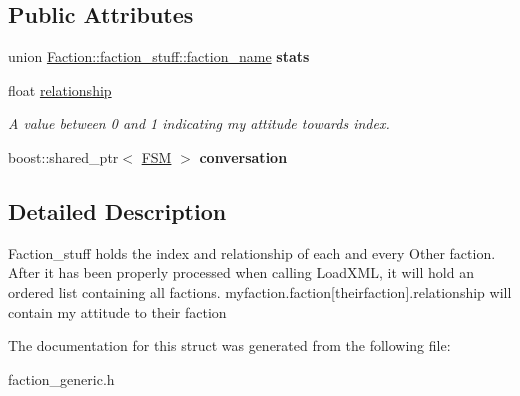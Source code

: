 \subsection*{Public Attributes}
\begin{DoxyCompactItemize}
\item 
union \hyperlink{unionFaction_1_1faction__stuff_1_1faction__name}{Faction\+::faction\+\_\+stuff\+::faction\+\_\+name} {\bfseries stats}\hypertarget{structFaction_1_1faction__stuff_a82354b1346d0fb335588e05049ee4167}{}\label{structFaction_1_1faction__stuff_a82354b1346d0fb335588e05049ee4167}

\item 
float \hyperlink{structFaction_1_1faction__stuff_a4610e6a1ac2bf7dea1bedc1cb4154c39}{relationship}\hypertarget{structFaction_1_1faction__stuff_a4610e6a1ac2bf7dea1bedc1cb4154c39}{}\label{structFaction_1_1faction__stuff_a4610e6a1ac2bf7dea1bedc1cb4154c39}

\begin{DoxyCompactList}\small\item\em A value between 0 and 1 indicating my attitude towards index. \end{DoxyCompactList}\item 
boost\+::shared\+\_\+ptr$<$ \hyperlink{classFSM}{F\+SM} $>$ {\bfseries conversation}\hypertarget{structFaction_1_1faction__stuff_a88fa348d8723683b9d2da02c7d1e2240}{}\label{structFaction_1_1faction__stuff_a88fa348d8723683b9d2da02c7d1e2240}

\end{DoxyCompactItemize}


\subsection{Detailed Description}
Faction\+\_\+stuff holds the index and relationship of each and every Other faction. After it has been properly processed when calling Load\+X\+ML, it will hold an ordered list containing all factions. myfaction.\+faction\mbox{[}theirfaction\mbox{]}.relationship will contain my attitude to their faction 

The documentation for this struct was generated from the following file\+:\begin{DoxyCompactItemize}
\item 
faction\+\_\+generic.\+h\end{DoxyCompactItemize}
